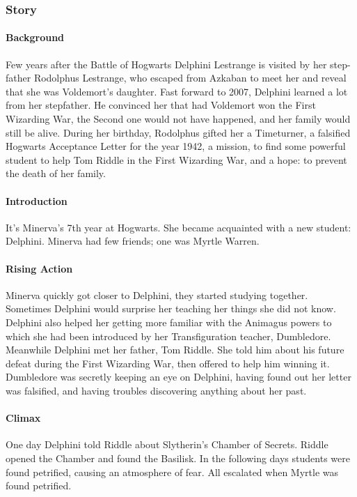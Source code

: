 \subsubsection*{Story}

\paragraph{Background}
Few years after the Battle of Hogwarts Delphini Lestrange is visited by her step-father Rodolphus Lestrange, who escaped from Azkaban to meet her and reveal that she was Voldemort's daughter.
Fast forward to 2007, Delphini learned a lot from her stepfather. He convinced her that had Voldemort won the First Wizarding War, the Second one would not have happened, and her family would still be alive. During her birthday, Rodolphus gifted her a Timeturner, a falsified Hogwarts Acceptance Letter for the year 1942, a mission, to find some powerful student to help Tom Riddle in the First Wizarding War, and a hope: to prevent the death of her family. 

\paragraph{Introduction}
It's Minerva's 7th year at Hogwarts. She became acquainted with a new student: Delphini. Minerva had few friends; one was Myrtle Warren.

\paragraph{Rising Action}
Minerva quickly got closer to Delphini, they started studying together. Sometimes Delphini would surprise her teaching her things she did not know. Delphini also helped her getting more familiar with the Animagus powers to which she had been introduced by her Transfiguration teacher, Dumbledore.
Meanwhile Delphini met her father, Tom Riddle. She told him about his future defeat during the First Wizarding War, then offered to help him winning it.
Dumbledore was secretly keeping an eye on Delphini, having found out her letter was falsified, and having troubles discovering anything about her past.

\paragraph{Climax}
One day Delphini told Riddle about Slytherin's Chamber of Secrets. Riddle opened the Chamber and found the Basilisk. In the following days students were found petrified, causing an atmosphere of fear. All escalated when Myrtle was found petrified.

